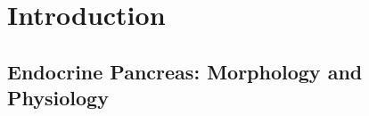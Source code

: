 


\chapter{Introduction}  %
\label{chapter1}

\newpage


\section{Endocrine Pancreas: Morphology and Physiology}  %
\label{sec:sec1-1endopanc}

